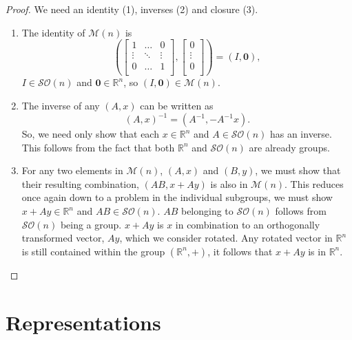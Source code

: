 \documentclass{article}
\begin{document}
\begin{proof}
    We need an identity (1), inverses (2) and closure (3). \par
\begin{enumerate}
    \item The identity of $\mathcal{M}(n)$ is 
    \[ 
        \left( 
            \begin{bmatrix} 1 & \ldots & 0 \\
                \vdots & \ddots & \vdots \\
                0 & \ldots & 1 \\
            \end{bmatrix} ,
            \begin{bmatrix}0 \\ \vdots \\ 0 \\ \end{bmatrix}\right)
            = 
            \left(I, \mathbf{0} \right) ,
    \] 
    $I \in \mathcal{SO}(n)$ and $\mathbf{0} \in \mathbb{R}^{n}$, so $(I, \mathbf{0}) \in \mathcal{M}(n)$. \par
    \item The inverse of any $(A,x)$ can be written as
        \[%
            (A,x)^{-1} = (A^{-1}, -A^{-1}x) .
        \]%
        So, we need only show that each $x \in \mathbb{R}^{n}$ and $A \in \mathcal{SO}(n)$ has an inverse. This follows from the fact that both $\mathbb{R}^{n}$ and $\mathcal{SO}(n)$ are already groups. \par
    \item For any two elements in $\mathcal{M}(n)$, $(A,x)$ and $(B,y)$, we must show that their resulting combination, $(AB,x+Ay)$ is also in $\mathcal{M}(n)$. This reduces once again down to a problem in the individual subgroups, we must show $x+Ay \in \mathbb{R}^{n}$ and $AB \in \mathcal{SO}(n)$. $AB$ belonging to $\mathcal{SO}(n)$ follows from $\mathcal{SO}(n)$ being a group. $x+Ay$ is $x$ in combination to an orthogonally transformed vector, $Ay$, which we consider rotated. Any rotated vector in $\mathbb{R}^{n}$ is still contained within the group $(\mathbb{R}^{n},+)$, it follows that $x+Ay$ is in $\mathbb{R}^{n}$. \end{enumerate}
\end{proof}

\section{Representations} 
\end{document}
